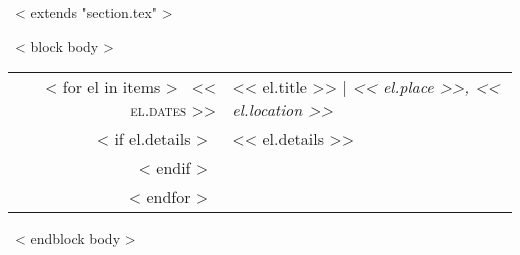 ~< extends "section.tex" >~

~< block body >~

\begin{tabular}{r|p{11cm}}
    ~< for el in items >~
        \textsc{<< el.dates >>} & << el.title >> | \emph{<< el.place >>, << el.location >>}\\
        ~< if el.details >~&\footnotesize{<< el.details >>}\\~< endif >~\multicolumn{2}{c}{}\\
    ~< endfor >~
\end{tabular}

~< endblock body >~